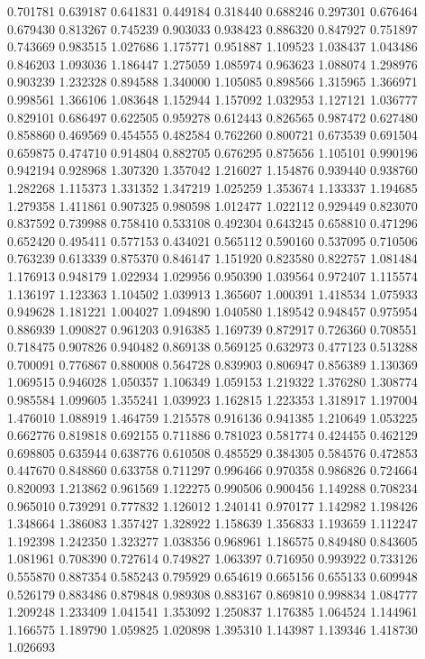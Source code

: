 0.701781
0.639187
0.641831
0.449184
0.318440
0.688246
0.297301
0.676464
0.679430
0.813267
0.745239
0.903033
0.938423
0.886320
0.847927
0.751897
0.743669
0.983515
1.027686
1.175771
0.951887
1.109523
1.038437
1.043486
0.846203
1.093036
1.186447
1.275059
1.085974
0.963623
1.088074
1.298976
0.903239
1.232328
0.894588
1.340000
1.105085
0.898566
1.315965
1.366971
0.998561
1.366106
1.083648
1.152944
1.157092
1.032953
1.127121
1.036777
0.829101
0.686497
0.622505
0.959278
0.612443
0.826565
0.987472
0.627480
0.858860
0.469569
0.454555
0.482584
0.762260
0.800721
0.673539
0.691504
0.659875
0.474710
0.914804
0.882705
0.676295
0.875656
1.105101
0.990196
0.942194
0.928968
1.307320
1.357042
1.216027
1.154876
0.939440
0.938760
1.282268
1.115373
1.331352
1.347219
1.025259
1.353674
1.133337
1.194685
1.279358
1.411861
0.907325
0.980598
1.012477
1.022112
0.929449
0.823070
0.837592
0.739988
0.758410
0.533108
0.492304
0.643245
0.658810
0.471296
0.652420
0.495411
0.577153
0.434021
0.565112
0.590160
0.537095
0.710506
0.763239
0.613339
0.875370
0.846147
1.151920
0.823580
0.822757
1.081484
1.176913
0.948179
1.022934
1.029956
0.950390
1.039564
0.972407
1.115574
1.136197
1.123363
1.104502
1.039913
1.365607
1.000391
1.418534
1.075933
0.949628
1.181221
1.004027
1.094890
1.040580
1.189542
0.948457
0.975954
0.886939
1.090827
0.961203
0.916385
1.169739
0.872917
0.726360
0.708551
0.718475
0.907826
0.940482
0.869138
0.569125
0.632973
0.477123
0.513288
0.700091
0.776867
0.880008
0.564728
0.839903
0.806947
0.856389
1.130369
1.069515
0.946028
1.050357
1.106349
1.059153
1.219322
1.376280
1.308774
0.985584
1.099605
1.355241
1.039923
1.162815
1.223353
1.318917
1.197004
1.476010
1.088919
1.464759
1.215578
0.916136
0.941385
1.210649
1.053225
0.662776
0.819818
0.692155
0.711886
0.781023
0.581774
0.424455
0.462129
0.698805
0.635944
0.638776
0.610508
0.485529
0.384305
0.584576
0.472853
0.447670
0.848860
0.633758
0.711297
0.996466
0.970358
0.986826
0.724664
0.820093
1.213862
0.961569
1.122275
0.990506
0.900456
1.149288
0.708234
0.965010
0.739291
0.777832
1.126012
1.240141
0.970177
1.142982
1.198426
1.348664
1.386083
1.357427
1.328922
1.158639
1.356833
1.193659
1.112247
1.192398
1.242350
1.323277
1.038356
0.968961
1.186575
0.849480
0.843605
1.081961
0.708390
0.727614
0.749827
1.063397
0.716950
0.993922
0.733126
0.555870
0.887354
0.585243
0.795929
0.654619
0.665156
0.655133
0.609948
0.526179
0.883486
0.879848
0.989308
0.883167
0.869810
0.998834
1.084777
1.209248
1.233409
1.041541
1.353092
1.250837
1.176385
1.064524
1.144961
1.166575
1.189790
1.059825
1.020898
1.395310
1.143987
1.139346
1.418730
1.026693
